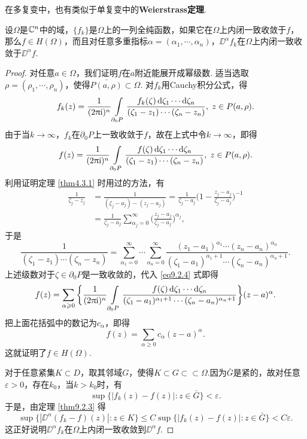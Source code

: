 在多复变中，也有类似于单复变中的\textbf{Weierstrass定理}.
\begin{theorem}\label{thm9.2.4}
  设$\Omega$是$\mathbb C^n$中的域，$\{f_k\}$是$\Omega$上的一列全纯函数，如果它在$\Omega$上内闭一致收敛于$f$，那么$f\in H(\Omega)$，而且对任意多重指标$\alpha=(\alpha_1,\cdots,\alpha_n)$，$\DD^\alpha f_k$在$\Omega$上内闭一致收敛于$\DD^\alpha f$.
\end{theorem}
\begin{proof}
  对任意$a\in\Omega$，我们证明$f$在$a$附近能展开成幂级数. 适当选取$\rho=(\rho_1,\cdots,\rho_n)$，使得$\bar{P(a,\rho)}\subset\Omega$. 对$f_k$用Cauchy积分公式，得
  \[
    f_k(z) = \frac1{(2\uppi\mathrm i)^n}\int\limits_{\partial_0P}\frac{f_k(\zeta)\mathop{}\!\mathrm{d} \zeta_1\cdots\mathop{}\!\mathrm{d} \zeta_n}{(\zeta_1-z_1)\cdots(\zeta_n-z_n)},\;z\in P(a,\rho).
  \]
  由于当$k\to\infty$，$f_k$在$\partial_0P$上一致收敛于$f$，故在上式中令$k\to\infty$，即得
  \begin{equation}\label{eq9.2.4}
    f(z) = \frac1{(2\uppi\mathrm i)^n}\int\limits_{\partial_0P}\frac{f(\zeta)\mathop{}\!\mathrm{d} \zeta_1\cdots\mathop{}\!\mathrm{d} \zeta_n}{(\zeta_1-z_1)\cdots(\zeta_n-z_n)},\;z\in P(a,\rho).
  \end{equation}
  利用证明定理 \ref{thm4.3.1} 时用过的方法，有
  \begin{align*}
    \frac1{\zeta_j-z_j} & = \frac1{(\zeta_j-a_j)-(z_j-a_j)}
    = \frac1{\zeta_j-a_j}\bigg(1-\frac{z_j-a_j}{\zeta_j-a_j}\bigg)^{-1}\\
    & = \frac1{\zeta_j-a_j}\sum_{\alpha_j=0}^\infty\bigg(\frac{z_j-a_j}{\zeta_j-a_j}\bigg)^{\alpha_j},
  \end{align*}
  于是
  \[
    \frac1{(\zeta_1-z_1)\cdots(\zeta_n-z_n)}=\sum_{\alpha_1=0}^\infty\cdots
    \sum_{\alpha_n=0}^\infty\frac{(z_1-a_1)^{\alpha_1}\cdots(z_n-a_n)^{\alpha_n}}
    {(\zeta_1-a_1)^{\alpha_1+1}\cdots(\zeta_n-a_n)^{\alpha_n+1}}.
  \]
  上述级数对于$\zeta\in\partial_0P$是一致收敛的，代入 \eqref{eq9.2.4} 式即得
  \[
    f(z) = \sum_{\alpha\geqslant0}\bigg\{\frac1{(2\uppi\mathrm i)^n}\int\limits_{\partial_0P}
    \frac{f(\zeta)\mathop{}\!\mathrm{d} \zeta_1\cdots\mathop{}\!\mathrm{d} \zeta_n}
    {(\zeta_1-a_1)^{\alpha_1+1}\cdots(\zeta_n-a_n)^{\alpha_n+1}}\bigg\}(z-a)^\alpha.
  \]
  把上面花括弧中的数记为$c_\alpha$，即得
  \[
    f(z) = \sum_{\alpha\ge0}c_\alpha(z-a)^\alpha.
  \]
  这就证明了$f\in H(\Omega)$.

  对于任意紧集$K\subset D$，取其邻域$G$，使得$K\subset G\subset\subset \Omega$.因为$\bar G$是紧的，故对任意$\varepsilon>0$，存在$k_0$，当$k>k_0$时，有
  \[
    \sup\{|f_k(z)-f(z)|:z\in\bar G\}<\varepsilon.
  \]
  于是，由定理 \ref{thm9.2.3} 得
  \[
    \sup\{|\DD^\alpha(f_k-f)(z)|:z\in K\}\le C\sup\{|f_k(z)-f(z)|:z\in\bar G\}
  < C\varepsilon.
  \]
  这正好说明$\DD^\alpha f_k$在$\Omega$上内闭一致收敛到$\DD^\alpha f$.
\end{proof}

